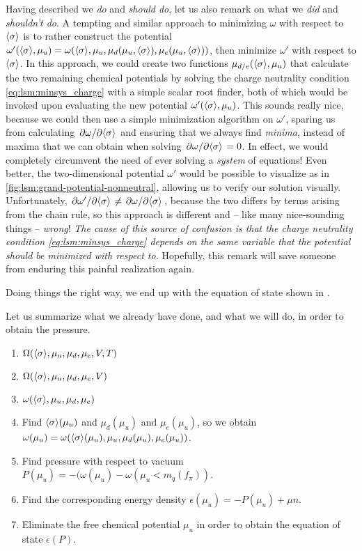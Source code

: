 Having described we \emph{do} and \emph{should do}, let us also remark on what we \emph{did} and \emph{shouldn't do}.
A tempting and similar approach to minimizing $\omega$ with respect to $\langle \sigma \rangle$ is to rather construct the potential $\omega'(\langle \sigma \rangle, \mu_u) = \omega(\langle \sigma \rangle, \mu_u, \mu_d(\mu_u,\langle \sigma \rangle), \mu_e(\mu_u,\langle \sigma \rangle))$, then minimize $\omega'$ with respect to $\langle \sigma \rangle$.
In this approach, we could create two functions $\mu_{d/e}(\langle \sigma \rangle,\mu_u)$ that calculate the two remaining chemical potentials by solving the charge neutrality condition \eqref{eq:lsm:minsys_charge} with a simple scalar root finder, both of which would be invoked upon evaluating the new potential $\omega'(\langle \sigma \rangle,\mu_u)$.
This sounds really nice, because we could then use a simple minimization algorithm on $\omega'$, sparing us from calculating $\pdv{\omega}/{\langle \sigma \rangle}$ and ensuring that we always find \emph{minima}, instead of maxima that we can obtain when solving $\pdv{\omega}/{\langle \sigma \rangle}=0$.
In effect, we would completely circumvent the need of ever solving a \emph{system} of equations!
Even better, the two-dimensional potential $\omega'$ would be possible to visualize as in \cref{fig:lsm:grand-potential-nonneutral}, allowing us to verify our solution visually.
Unfortunately, $\pdv{\omega'}/{\langle \sigma \rangle} \neq \pdv{\omega}/{\langle \sigma \rangle}$, because the two differs by terms arising from the chain rule, so this approach is different and -- like many nice-sounding things -- \emph{wrong}!
\emph{The cause of this source of confusion is that the charge neutrality condition \eqref{eq:lsm:minsys_charge} depends on the same variable that the potential should be minimized with respect to.}
Hopefully, this remark will save someone from enduring this painful realization again.

Doing things the right way, we end up with the equation of state shown in .

Let us summarize what we already have done, and what we will do, in order to obtain the pressure.
\begin{enumerate}
\item $\Omega(\langle \sigma \rangle, \mu_u, \mu_d, \mu_e, V, T)$
\item $\Omega(\langle \sigma \rangle, \mu_u, \mu_d, \mu_e, V)$
\item $\omega(\langle \sigma \rangle, \mu_u, \mu_d, \mu_e)$
\item Find $\langle \sigma \rangle(\mu_u)$ and $\mu_d(\mu_u)$ and $\mu_e(\mu_u)$, so we obtain $\omega(\mu_u) = \omega(\langle \sigma \rangle(\mu_u), \mu_u, \mu_d(\mu_u), \mu_e(\mu_u))$.
\item Find pressure with respect to vacuum $P(\mu_u) = -(\omega(\mu_u)-\omega(\mu_u<m_q(f_\pi))$.
\item Find the corresponding energy density $\epsilon(\mu_u) = -P(\mu_u) + \mu n$.
\item Eliminate the free chemical potential $\mu_u$ in order to obtain the equation of state $\epsilon(P)$.
\end{enumerate}

